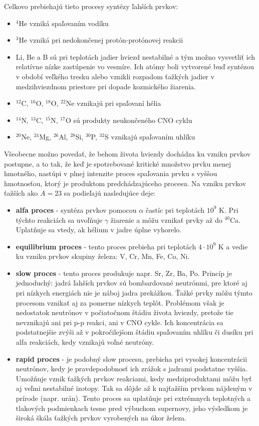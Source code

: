 \documentclass[../../main.tex]{subfiles}
\begin{document}
Celkovo prebiehajú tieto procesy syntézy ľahších prvkov:
\begin{itemize}
\item $^4$He vzniká spaľovaním vodíku
\item $^3$He vzniká pri nedokončenej protón-protónovej reakcii
\item Li, Be a B sú pri teplotách jadier hviezd nestabilné a tým možno vysvetliť ich relatívne nízke zastúpenie vo vesmíre. Ich atómy boli vytvorené buď syntézou v období veľkého tresku alebo vznikli rozpadom ťažkých jadier v medzihviezdnom priestore pri dopade kozmického žiarenia.
\item $^{12}$C, $^{16}$O, $^{18}$O, $^{22}$Ne vznikajú pri spaľovaní hélia
\item $^{14}$N, $^{13}$C, $^{15}$N, $^{17}$O sú produkty neukončeného CNO cyklu
\item $^{20}$Ne, $^{24}$Mg, $^{26}$Al, $^{28}$Si, $^{30}$P, $^{32}$S vznikajú spaľovaním uhlíku
\end{itemize}

Všeobecne možno povedať, že behom života hviezdy dochádza ku vzniku prvkov postupne, a to tak, že keď je spotrebované kritické množstvo prvku menej hmotného, nastúpi v plnej intenzite proces spaľovania prvku s vyššou hmotnosťou, ktorý je produktom predchádzajúceho procesu. Na vzniku prvkov ťažších ako $A=23$ sa podieľajú nasledujúce deje:
\begin{itemize}
\item \textbf{alfa proces} - syntéza prvkov pomocou $\alpha$ častíc pri teplotách $10^9$ K. Pri týchto reakciách sa uvoľňuje $\gamma$ žiarenie a môžu vznikať prvky až do $^{40}$Ca. Uplatňuje sa vtedy, ak hélium v jadre úplne vyhorelo.
\item \textbf{equilibrium proces} - tento proces prebieha pri teplotách $4\cdot 10^9$ K a vedie ku vzniku prvkov skupiny železa: V, Cr, Mn, Fe, Co, Ni. 
\item \textbf{slow proces} - tento proces produkuje napr. Sr, Zr, Ba, Po. Princíp je jednoduchý: jadrá ľahších prvkov sú bombardované neutrónmi, pre ktoré aj pri nízkych energiách nie je náboj jadra prekážkou. Ťažké prvky môžu týmto procesom vznikať aj za pomerne nízkych teplôt. Problémom však je nedostatok neutrónov v počiatočnom štádiu života hviezdy, pretože tie nevznikajú ani pri p-p reakci, ani v CNO cykle. Ich koncentrácia sa podstatnejšie zvýši až v pokročilejšom štádiu spaľovaním uhlíku či dusíku pri alfa reakciách, kedy vznikajú voľné neutróny.
\item \textbf{rapid proces} - je podobný slow procesu, prebieha pri vysokej koncentrácii neutrónov, kedy je pravdepodobnosť ich zrážok s jadrami podstatne vyššia. Umožňuje vznik ťažkých prvkov reakciami, kedy medziproduktami môžu byť aj veľmi nestabilné izotopy. Tak sa dôjde až k najťažším prvkom nájdeným v prírode (napr. urán). Tento proces sa uplatňuje pri extrémnych teplotných a tlakových podmienkach tesne pred výbuchom supernovy, jeho výsledkom je široká škála ťažkých prvkov vyrobených na úkor železa.
\end{itemize}
\end{document}
